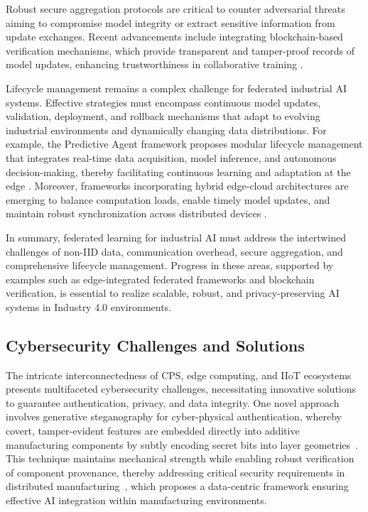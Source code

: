 \documentclass[sigconf]{acmart}
\begin{document}
Robust secure aggregation protocols are critical to counter adversarial threats aiming to compromise model integrity or extract sensitive information from update exchanges. Recent advancements include integrating blockchain-based verification mechanisms, which provide transparent and tamper-proof records of model updates, enhancing trustworthiness in collaborative training \cite{ref38}.

Lifecycle management remains a complex challenge for federated industrial AI systems. Effective strategies must encompass continuous model updates, validation, deployment, and rollback mechanisms that adapt to evolving industrial environments and dynamically changing data distributions. For example, the Predictive Agent framework proposes modular lifecycle management that integrates real-time data acquisition, model inference, and autonomous decision-making, thereby facilitating continuous learning and adaptation at the edge \cite{ref37}. Moreover, frameworks incorporating hybrid edge-cloud architectures are emerging to balance computation loads, enable timely model updates, and maintain robust synchronization across distributed devices \cite{ref36}.

In summary, federated learning for industrial AI must address the intertwined challenges of non-IID data, communication overhead, secure aggregation, and comprehensive lifecycle management. Progress in these areas, supported by examples such as edge-integrated federated frameworks and blockchain verification, is essential to realize scalable, robust, and privacy-preserving AI systems in Industry 4.0 environments.

\subsection{Cybersecurity Challenges and Solutions}

The intricate interconnectedness of CPS, edge computing, and IIoT ecosystems presents multifaceted cybersecurity challenges, necessitating innovative solutions to guarantee authentication, privacy, and data integrity. One novel approach involves generative steganography for cyber-physical authentication, whereby covert, tamper-evident features are embedded directly into additive manufacturing components by subtly encoding secret bits into layer geometries~\cite{ref9}. This technique maintains mechanical strength while enabling robust verification of component provenance, thereby addressing critical security requirements in distributed manufacturing~\cite{ref13}, which proposes a data-centric framework ensuring effective AI integration within manufacturing environments.
\end{document}
